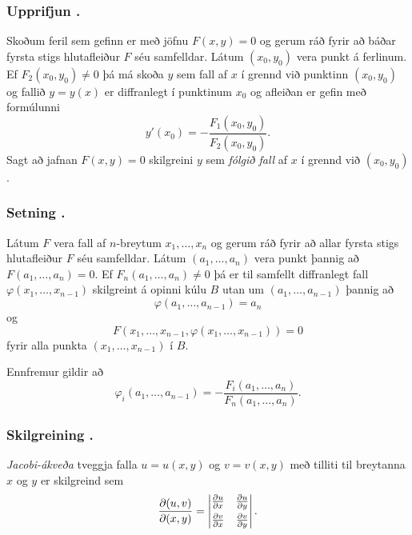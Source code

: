 \subsubsection{Upprifjun \kaflanr.}
 Skoðum feril sem gefinn er með jöfnu $F(x,y)=0$
og gerum ráð fyrir að báðar fyrsta stigs
hlutafleiður $F$ séu samfelldar.  Látum $(x_0,y_0)$
vera punkt á ferlinum.  Ef $F_2(x_0,y_0)\neq 0$ þá má skoða $y$ sem
fall af $x$ í grennd við punktinn $(x_0,y_0)$ og fallið $y=y(x)$ er
diffranlegt í punktinum $x_0$ og afleiðan er gefin með formúlunni
$$y'(x_0)=-\frac{F_1(x_0,y_0)}{F_2(x_0,y_0)}.$$
Sagt að jafnan $F(x,y)=0$ skilgreini $y$ sem {\em fólgið fall} af $x$
  í grennd við $(x_0,y_0)$.  




\subsubsection{Setning \kaflanr.}
Látum $F$ vera fall af $n$-breytum $x_1, \ldots,
x_n$ og gerum ráð fyrir að allar fyrsta stigs hlutafleiður  $F$ séu
samfelldar.   Látum $(a_1,\ldots,a_n)$ vera punkt þannig að 
$F(a_1,\ldots,a_n)=0$.  Ef $F_n(a_1,\ldots,a_n)\neq 0$ þá er til
samfellt diffranlegt fall $\varphi(x_1, \ldots, x_{n-1})$ skilgreint á 
opinni kúlu $B$
utan um $(a_1,\ldots,a_{n-1})$ þannig að 
$$\varphi(a_1,\ldots,a_{n-1})=a_n$$ 
og 
$$F(x_1,\ldots, x_{n-1}, \varphi(x_1, \ldots, x_{n-1}))=0$$
fyrir alla punkta $(x_1, \ldots, x_{n-1})$ í $B$.

Ennfremur gildir að 
$$\varphi_i(a_1,\ldots,a_{n-1})
=-\frac{F_i(a_1,\ldots,a_n)}{F_n(a_1,\ldots,a_n)}.$$ 



\subsubsection{Skilgreining \kaflanr.}
  
{\em Jacobi-ákveða} tveggja falla $u=u(x,y)$ og $v=v(x,y)$ með
tilliti til breytanna $x$ og $y$ er skilgreind sem 
$$\frac{\partial(u,v)}{\partial(x,y)}=
\begin{vmatrix} 
\frac{\partial u}{\partial x}&\frac{\partial u}{\partial y}\\
\noalign{\smallskip}
\frac{\partial v}{\partial x}&\frac{\partial v}{\partial y}
\end{vmatrix}.$$



